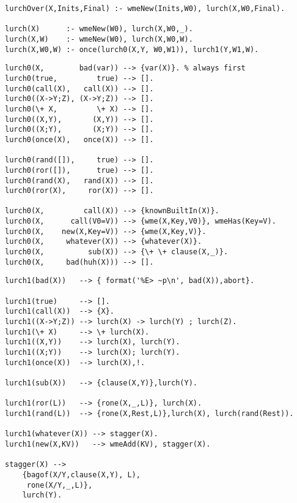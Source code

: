 \begin{Verbatim}
lurchOver(X,Inits,Final) :- wmeNew(Inits,W0), lurch(X,W0,Final).

lurch(X)      :- wmeNew(W0), lurch(X,W0,_).
lurch(X,W)    :- wmeNew(W0), lurch(X,W0,W). 
lurch(X,W0,W) :- once(lurch0(X,Y, W0,W1)), lurch1(Y,W1,W).
\end{Verbatim}
\begin{Verbatim}
lurch0(X,        bad(var)) --> {var(X)}. % always first
lurch0(true,         true) --> [].
lurch0(call(X),   call(X)) --> [].
lurch0((X->Y;Z), (X->Y;Z)) --> [].
lurch0(\+ X,         \+ X) --> [].
lurch0((X,Y),       (X,Y)) --> [].
lurch0((X;Y),       (X;Y)) --> [].
lurch0(once(X),   once(X)) --> [].

lurch0(rand([]),     true) --> [].
lurch0(ror([]),      true) --> [].
lurch0(rand(X),   rand(X)) --> [].
lurch0(ror(X),     ror(X)) --> [].

lurch0(X,         call(X)) --> {knownBuiltIn(X)}.
lurch0(X,      call(V0=V)) --> {wme(X,Key,V0)}, wmeHas(Key=V).
lurch0(X,    new(X,Key=V)) --> {wme(X,Key,V)}. 
lurch0(X,     whatever(X)) --> {whatever(X)}.
lurch0(X,          sub(X)) --> {\+ \+ clause(X,_)}.
lurch0(X,     bad(huh(X))) --> [].
\end{Verbatim}
\begin{Verbatim}
lurch1(bad(X))   --> { format('%E> ~p\n', bad(X)),abort}.

lurch1(true)     --> [].
lurch1(call(X))  --> {X}.
lurch1((X->Y;Z)) --> lurch(X) -> lurch(Y) ; lurch(Z).
lurch1(\+ X)     --> \+ lurch(X).
lurch1((X,Y))    --> lurch(X), lurch(Y).
lurch1((X;Y))    --> lurch(X); lurch(Y).
lurch1(once(X))  --> lurch(X),!.

lurch1(sub(X))   --> {clause(X,Y)},lurch(Y).

lurch1(ror(L))   --> {rone(X,_,L)}, lurch(X).
lurch1(rand(L))  --> {rone(X,Rest,L)},lurch(X), lurch(rand(Rest)).

lurch1(whatever(X)) --> stagger(X).
lurch1(new(X,KV))   --> wmeAdd(KV), stagger(X).

stagger(X) -->
	{bagof(X/Y,clause(X,Y), L),
	 rone(X/Y,_,L)},
	lurch(Y).
\end{Verbatim}
